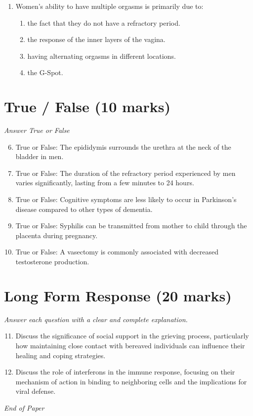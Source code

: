 \documentclass[12pt]{article}
\begin{document}
\begin{enumerate}[label=\arabic*.]
\begin{enumerate}[label=(\alph*)]
    \item fourth pharyngeal arch.
\end{enumerate}
\item Women's ability to have multiple orgasms is primarily due to:
\begin{enumerate}[label=(\alph*)]
    \item the fact that they do not have a refractory period.
    \item the response of the inner layers of the vagina.
    \item having alternating orgasms in different locations.
    \item the G-Spot.
\end{enumerate}
\end{enumerate}

\section*{True / False (10 marks)}
\textit{Answer True or False}
\begin{enumerate}[label=\arabic*.]
\setcounter{enumi}{5}
\item True or False: The epididymis surrounds the urethra at the neck of the bladder in men.
\item True or False: The duration of the refractory period experienced by men varies significantly, lasting from a few minutes to 24 hours.
\item True or False: Cognitive symptoms are less likely to occur in Parkinson's disease compared to other types of dementia.
\item True or False: Syphilis can be transmitted from mother to child through the placenta during pregnancy.
\item True or False: A vasectomy is commonly associated with decreased testosterone production.
\end{enumerate}

\section*{Long Form Response (20 marks)}
\textit{Answer each question with a clear and complete explanation.}
\begin{enumerate}[label=\arabic*.]
\setcounter{enumi}{10}
\item Discuss the significance of social support in the grieving process, particularly how maintaining close contact with bereaved individuals can influence their healing and coping strategies.
\item Discuss the role of interferons in the immune response, focusing on their mechanism of action in binding to neighboring cells and the implications for viral defense.
\end{enumerate}

\vfill
\noindent\textit{End of Paper}
\end{document}
